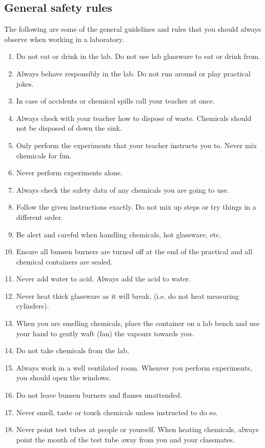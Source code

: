 \begin{enumerate}[label=\textbf{\arabic*}.]
\subsection*{General safety rules}
            \nopagebreak
The following are some of the general guidelines and rules that you should always observe when working in a laboratory.
\begin{enumerate}[noitemsep, label=\textbf{\arabic*}. ] 
\item Do not eat or drink in the lab. Do not use lab glassware to eat or drink from.
\item Always behave responsibly in the lab. Do not run around or play practical jokes.
\item In case of accidents or chemical spills call your teacher at once.
\item Always check with your teacher how to dispose of waste. Chemicals should not be disposed of down the sink.
\item Only perform the experiments that your teacher instructs you to. Never mix chemicals for fun.
\item Never perform experiments alone. 
\item Always check the safety data of any chemicals you are going to use. 
\item Follow the given instructions exactly. Do not mix up steps or try things in a different order.
\item Be alert and careful when handling chemicals, hot glassware, etc.  
\item Ensure all bunsen burners are turned off at the end of the practical and all chemical containers are sealed.
\item Never add water to acid. Always add the acid to water.
\item Never heat thick glassware as it will break. (i.e. do not heat measuring cylinders).
\item When you are smelling chemicals, place the container on a lab bench and use your hand to gently waft (fan) the vapours towards you.
\item Do not take chemicals from the lab.
\item Always work in a well ventilated room. Whenver you perform experiments, you should open the windows.
\item Do not leave bunsen burners and flames unattended. 
\item Never smell, taste or touch chemicals unless instructed to do so.
\item Never point test tubes at people or yourself. When heating chemicals, always point the mouth of the test tube away from you and your classmates.
\end{enumerate}
\par 

\end{enumerate}
